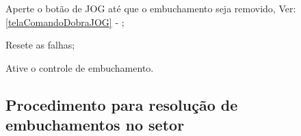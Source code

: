 \begin{procedureFixingIsuesSector2}
\begin{procedureFixingIsuesSector2.2}
    \item[\ding{\dingNumber}] Aperte o botão de JOG até que o embuchamento seja removido, Ver: \ref{telaComandoDobraJOG} - ;
    
  \end{procedureFixingIsuesSector2.2}
  
  \item[\ding{\dingNumber}] Resete as falhas;
  \item[\ding{\dingNumber}] Ative o controle de embuchamento.
  
\end{procedureFixingIsuesSector2}

\fi

\subsection{Procedimento para resolução de embuchamentos no setor  \fi {} \fi}


